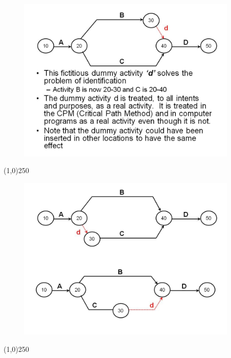 \begin{frame}
\begin{figure}
	\centering
		\includegraphics[width = 10.5cm]{oldnotes/Slide52.jpg}
\end{figure}
\end{frame}
\begin{center}\line(1,0){250}\end{center}





\begin{frame}
\begin{figure}
	\centering
		\includegraphics[width = 10.5cm]{oldnotes/Slide53.jpg}
\end{figure}
\end{frame}
\begin{center}\line(1,0){250}\end{center}





